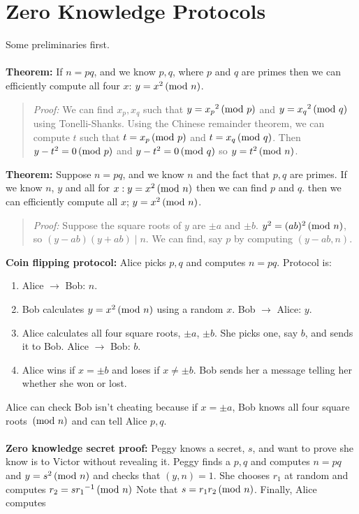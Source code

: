 \section{Zero Knowledge Protocols}
Some preliminaries first.
\\
\\
{\bf Theorem:} If $n=pq$, and we know $p, q$, where $p$ and $q$ are primes
then we can efficiently compute all four $x$: $y = x^2 \thinspace \textnormal{(mod } n \textnormal{)}$.
\begin{quote}
\emph{Proof:}
We can find $x_p, x_q$ such that $y= {x_p}^2 \thinspace \textnormal{(mod } p \textnormal{)}$ and
$y= {x_q}^2 \thinspace \textnormal{(mod } q \textnormal{)}$ using Tonelli-Shanks.  Using the Chinese remainder theorem, we can compute $t$ such that
$t = x_p \thinspace \textnormal{(mod } p \textnormal{)}$ and 
$t = x_q \thinspace \textnormal{(mod } q \textnormal{)}$.  Then $y-t^2 = 0 \thinspace \textnormal{(mod } p \textnormal{)}$
and $y-t^2 = 0 \thinspace \textnormal{(mod } q \textnormal{)}$ so $y= t^2 \thinspace \textnormal{(mod } n \textnormal{)}$.
\end{quote}
{\bf Theorem:} Suppose $n=pq$, and we know $n$ and the fact that $p, q$ are primes.
If we know $n$, $y$  and all for $x: y= x^2 \thinspace \textnormal{(mod } n \textnormal{)}$ then we can find $p$ and $q$.
then we can efficiently compute all $x$; $y = x^2 \thinspace \textnormal{(mod } n \textnormal{)}$.
\begin{quote}
\emph{Proof:}
Suppose the square roots of $y$ are $\pm a$ and $\pm b$. $y^2 = (ab)^2 \thinspace \textnormal{(mod } n \textnormal{)}$, so
$(y-ab) (y+ab) \mid n$.  We can find, say $p$ by computing $(y-ab, n)$.
\end{quote}
{\bf Coin flipping protocol:} Alice picks $p, q$ and computes $n= pq$.  Protocol is:
\begin{enumerate}
\item Alice $\rightarrow$ Bob: $n$.
\item Bob calculates $y= x^2 \thinspace \textnormal{(mod } n \textnormal{)}$ using a random $x$. Bob $\rightarrow$ Alice: $y$.
\item Alice calculates all four square roots, $\pm a$, $\pm b$.  She picks one, say $b$,
and sends it to Bob.  Alice $\rightarrow$ Bob: $b$.
\item Alice wins if $x = \pm b$ and loses if $x \ne \pm b$.  Bob sends her a message telling her whether she won or
lost.
\end{enumerate}
Alice can check Bob isn't cheating because if $x = \pm a$, Bob knows all four square roots $\thinspace \textnormal{(mod } n \textnormal{)}$ and can
tell Alice $p, q$.
\\
\\
{\bf Zero knowledge secret proof:} Peggy knows a secret, $s$, and want to prove she know is to Victor without
revealing it.  Peggy finds a $p, q$ and computes $n=pq$ and $y= s^2 \thinspace \textnormal{(mod } n \textnormal{)}$ and checks that
$(y, n) = 1$.  She chooses $r_1$ at random and
computes $r_2 = s {r_1}^{-1} \thinspace \textnormal{(mod } n \textnormal{)}$  Note that $s = r_1 r_2 \thinspace \textnormal{(mod } n \textnormal{)}$.  Finally, Alice computes
